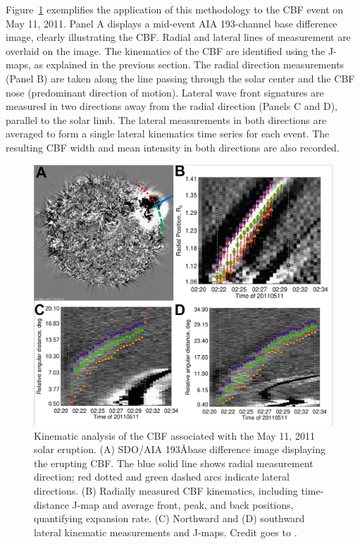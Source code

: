 Figure~\ref{fig_cbf_110511} exemplifies the application of this methodology to the CBF event on May 11, 2011. Panel A displays a mid-event AIA 193-channel base difference image, clearly illustrating the CBF. Radial and lateral lines of measurement are overlaid on the image. The kinematics of the CBF are identified using the J-maps, as explained in the previous section. The radial direction measurements (Panel B) are taken along the line passing through the solar center and the CBF nose (predominant direction of motion). Lateral wave front signatures are measured in two directions away from the radial direction (Panels C and D), parallel to the solar limb. The lateral measurements in both directions are averaged to form a single lateral kinematics time series for each event. The resulting CBF width and mean intensity in both directions are also recorded.

\begin{figure}[htp]
	\centering
	\includegraphics[width=0.9\hsize]{chapter2/figs/fig_110511_kinematics.jpg}
	\caption{Kinematic analysis of the CBF associated with the May 11, 2011 solar eruption. (A) SDO/AIA 193\AA base difference image displaying the erupting CBF. The blue solid line shows radial measurement direction; red dotted and green dashed arcs indicate lateral directions. (B) Radially measured CBF kinematics, including time-distance J-map and average front, peak, and back positions, quantifying expansion rate. (C) Northward and (D) southward lateral kinematic measurements and J-maps. Credit goes to \citet{kozarev_2022}.}
	\label{fig_cbf_110511}
\end{figure}

